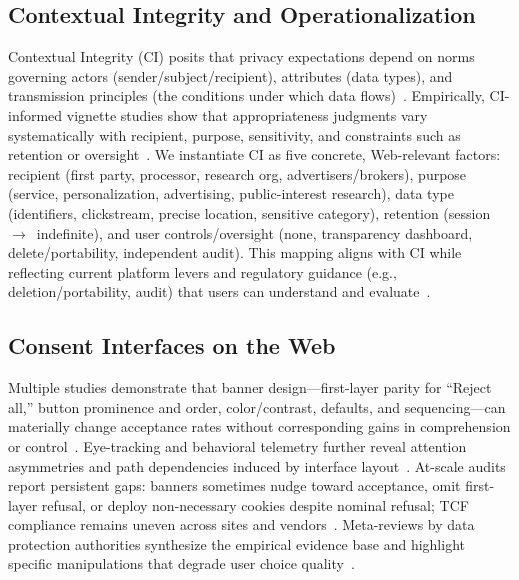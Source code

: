 \documentclass{eusset}
\begin{document}
\subsection{Contextual Integrity and Operationalization}
\label{subsec:ci}
Contextual Integrity (CI) posits that privacy expectations depend on norms governing actors (sender/subject/recipient), attributes (data types), and transmission principles (the conditions under which data flows)~\citep{Nissenbaum2004ContextualIntegrity}. Empirically, CI-informed vignette studies show that appropriateness judgments vary systematically with recipient, purpose, sensitivity, and constraints such as retention or oversight~\citep{MartinNissenbaum2016MeasuringPrivacy}. We instantiate CI as five concrete, Web-relevant factors: recipient (first party, processor, research org, advertisers/brokers), purpose (service, personalization, advertising, public-interest research), data type (identifiers, clickstream, precise location, sensitive category), retention (session~$\rightarrow$~indefinite), and user controls/oversight (none, transparency dashboard, delete/portability, independent audit). This mapping aligns with CI while reflecting current platform levers and regulatory guidance (e.g., deletion/portability, audit) that users can understand and evaluate~\citep{Gupta2023ConsumerViewsJAMA}.

\subsection{Consent Interfaces on the Web}
\label{subsec:cmp}
Multiple studies demonstrate that banner design---first-layer parity for ``Reject all,'' button prominence and order, color/contrast, defaults, and sequencing---can materially change acceptance rates without corresponding gains in comprehension or control~\citep{Nouwens2020CHI,Habib2022CHI,Bielova2024USENIX,Berens2024CoSe}. Eye-tracking and behavioral telemetry further reveal attention asymmetries and path dependencies induced by interface layout~\citep{Inal2024ETRA}. At-scale audits report persistent gaps: banners sometimes nudge toward acceptance, omit first-layer refusal, or deploy non-necessary cookies despite nominal refusal; TCF compliance remains uneven across sites and vendors~\citep{Smith2024WWWTCF,demir2024large,Matte2020DoCookieBannersRespect,Machuletz2020MultiplePurposes}. Meta-reviews by data protection authorities synthesize the empirical evidence base and highlight specific manipulations that degrade user choice quality~\citep{CNIL2022Survey}. 
\end{document}
